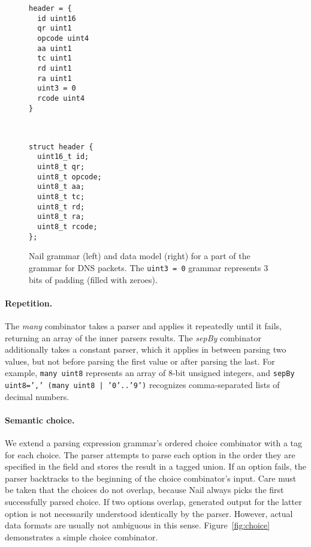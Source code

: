 \begin{figure}[tb]

\begin{minipage}{0.45\columnwidth}
\begin{verbatim}
header = {
  id uint16
  qr uint1
  opcode uint4
  aa uint1 
  tc uint1
  rd uint1
  ra uint1
  uint3 = 0
  rcode uint4
}
\end{verbatim} 
\end{minipage}
~
\begin{minipage}{0.45\columnwidth}
\begin{verbatim}
struct header {
  uint16_t id;
  uint8_t qr;
  uint8_t opcode;
  uint8_t aa;
  uint8_t tc;
  uint8_t rd;
  uint8_t ra;
  uint8_t rcode;
};
\end{verbatim} 
\end{minipage}

\caption{Nail grammar (left) and data model (right) for a part of the
grammar for DNS packets.  The \texttt{uint3 = 0} grammar represents
3 bits of padding (filled with zeroes).}
\label{fig:dns-struct}
\end{figure}


\paragraph{Repetition.}

The \emph{many} combinator takes a parser and applies it repeatedly
until it fails, returning an array of the inner parsers results. The
\emph{sepBy} combinator
additionally takes a constant parser, which it applies in between parsing
two values, but not before parsing the first value or after parsing the
last.
For example, \texttt{many uint8} represents an array of 8-bit unsigned
integers, and \texttt{sepBy uint8=',' (many uint8 | '0'..'9')} recognizes
comma-separated lists of decimal numbers.


\paragraph{Semantic choice.}

We extend a parsing expression grammar's ordered choice combinator with
a tag for each choice. The parser
attempts to parse each option in the order they are specified in the field and
stores the result in a tagged union. If an option fails, the parser backtracks
to the beginning of the choice combinator's input. Care must be taken that the
choices do not overlap, because Nail always picks the first successfully
parsed choice. If two options overlap, generated output for the latter option is
not necessarily understood identically by the parser. However, actual data
formats are usually not ambiguous in this sense.
Figure~\ref{fig:choice} demonstrates a simple choice combinator.

